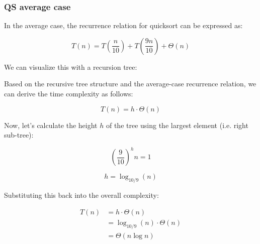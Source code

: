     \subsubsection{QS average case}
    \begin{derivation}
        In the average case, the recurrence relation for quicksort can be expressed as:

        \[
        T(n) = T\left(\frac{n}{10}\right) + T\left(\frac{9n}{10}\right) + \Theta(n)
        \]

        \noindent We can visualize this with a recursion tree:


        \noindent Based on the recursive tree structure and the average-case recurrence relation, we can derive the time complexity as follows:

        \[
        T(n) = h \cdot \Theta(n)
        \]

        \noindent Now, let's calculate the height \( h \) of the tree using the largest element (i.e. right sub-tree):

        \[
        \left(\frac{9}{10}\right)^h n = 1
        \]

        \[
        h = \log_{10/9}(n) 
        \]

        \noindent Substituting this back into the overall complexity:

        \begin{align*}
        T(n) &= h \cdot \Theta(n) \\
            &= \log_{10/9}(n) \cdot \Theta(n) \\
            &= \Theta(n \log n)
        \end{align*}

    \end{derivation}

